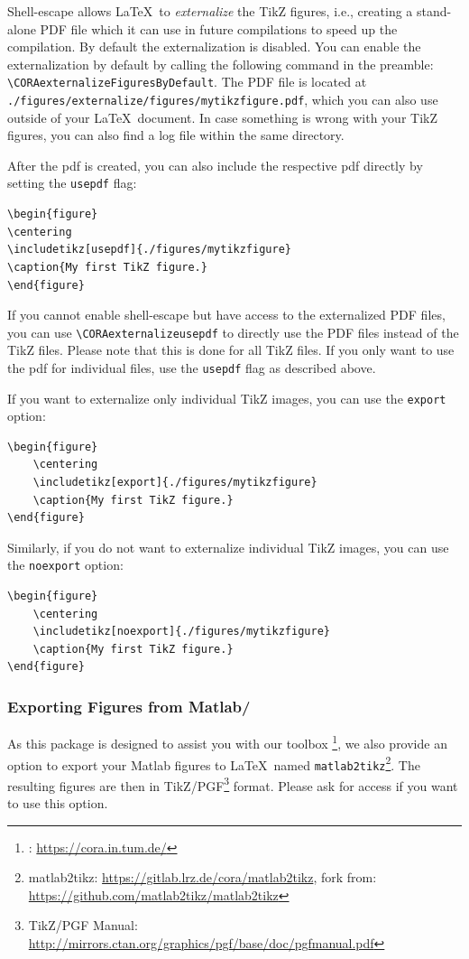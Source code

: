 \documentclass{article}
\begin{document}
Shell-escape allows \LaTeX\ to \emph{externalize} the TikZ figures,
i.e., creating a stand-alone PDF file which it can use in future compilations to speed up the compilation.
By default the externalization is disabled. You can enable the externalization by default by calling the following command in the preamble: \verb|\CORAexternalizeFiguresByDefault|.
The PDF file is located at \texttt{./figures/externalize/figures/mytikzfigure.pdf},
which you can also use outside of your \LaTeX\ document.
In case something is wrong with your TikZ figures, you can also find a log file within the same directory.

After the pdf is created, you can also include the respective pdf directly by setting the \texttt{usepdf} flag:
\begin{verbatim}
\begin{figure}
\centering
\includetikz[usepdf]{./figures/mytikzfigure}
\caption{My first TikZ figure.}
\end{figure}
\end{verbatim}
If you cannot enable shell-escape but have access to the externalized PDF files,
you can use \verb|\CORAexternalizeusepdf| to directly use the PDF files instead of the TikZ files.
Please note that this is done for all TikZ files.
If you only want to use the pdf for individual files, use the \texttt{usepdf} flag as described above.

If you want to externalize only individual TikZ images, you can use the \texttt{export} option:
\begin{verbatim}
\begin{figure}
    \centering
    \includetikz[export]{./figures/mytikzfigure}
    \caption{My first TikZ figure.}
\end{figure}
\end{verbatim}
Similarly, if you do not want to externalize individual TikZ images, you can use the \texttt{noexport} option:
\begin{verbatim}
\begin{figure}
    \centering
    \includetikz[noexport]{./figures/mytikzfigure}
    \caption{My first TikZ figure.}
\end{figure}
\end{verbatim}

\subsubsection{Exporting Figures from Matlab/\CORA}
As this package is designed to assist you with our toolbox \CORA\footnote{\CORA: \url{https://cora.in.tum.de/}},
we also provide an option to export your Matlab figures to \LaTeX\ named \texttt{matlab2tikz}\footnote{matlab2tikz: \url{https://gitlab.lrz.de/cora/matlab2tikz}, fork from: \url{https://github.com/matlab2tikz/matlab2tikz}}.
The resulting figures are then in TikZ/PGF\footnote{TikZ/PGF Manual: \url{http://mirrors.ctan.org/graphics/pgf/base/doc/pgfmanual.pdf}} format.
Please ask for access if you want to use this option.
\end{document}
